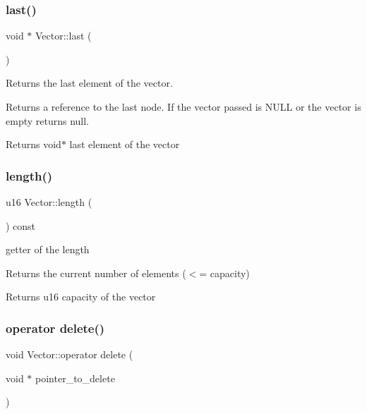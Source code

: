 \subsubsection{\texorpdfstring{last()}{last()}}
{\footnotesize\ttfamily void $\ast$ Vector\+::last (\begin{DoxyParamCaption}{ }\end{DoxyParamCaption})}



Returns the last element of the vector. 

Returns a reference to the last node. If the vector passed is N\+U\+LL or the vector is empty returns null.

\begin{DoxyReturn}{Returns}
void$\ast$ last element of the vector 
\end{DoxyReturn}
\mbox{\label{class_vector_a3326a8116d10d5d302b5ae8f4794fbb8}} 
\subsubsection{\texorpdfstring{length()}{length()}}
{\footnotesize\ttfamily u16 Vector\+::length (\begin{DoxyParamCaption}{ }\end{DoxyParamCaption}) const}



getter of the length 

Returns the current number of elements ($<$= capacity)

\begin{DoxyReturn}{Returns}
u16 capacity of the vector 
\end{DoxyReturn}
\mbox{\label{class_vector_a014c3802d82fb8348bd39ad7dcf9fcc5}} 
\subsubsection{\texorpdfstring{operator delete()}{operator delete()}}
{\footnotesize\ttfamily void Vector\+::operator delete (\begin{DoxyParamCaption}\item[{void $\ast$}]{pointer\+\_\+to\+\_\+delete }\end{DoxyParamCaption})}



